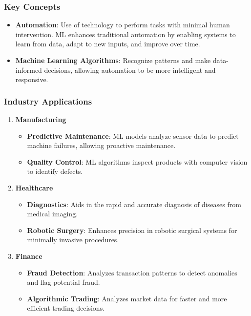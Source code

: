 \documentclass{beamer}
\begin{document}
\begin{frame}[fragile]
    \frametitle{Key Concepts}
    \begin{itemize}
        \item \textbf{Automation}: Use of technology to perform tasks with minimal human intervention. ML enhances traditional automation by enabling systems to learn from data, adapt to new inputs, and improve over time.
        \item \textbf{Machine Learning Algorithms}: Recognize patterns and make data-informed decisions, allowing automation to be more intelligent and responsive.
    \end{itemize}
\end{frame}

\begin{frame}[fragile]
    \frametitle{Industry Applications}
    \begin{enumerate}
        \item \textbf{Manufacturing}
        \begin{itemize}
            \item \textbf{Predictive Maintenance}: ML models analyze sensor data to predict machine failures, allowing proactive maintenance.
            \item \textbf{Quality Control}: ML algorithms inspect products with computer vision to identify defects.
        \end{itemize}

        \item \textbf{Healthcare}
        \begin{itemize}
            \item \textbf{Diagnostics}: Aids in the rapid and accurate diagnosis of diseases from medical imaging.
            \item \textbf{Robotic Surgery}: Enhances precision in robotic surgical systems for minimally invasive procedures.
        \end{itemize}
        
        \item \textbf{Finance}
        \begin{itemize}
            \item \textbf{Fraud Detection}: Analyzes transaction patterns to detect anomalies and flag potential fraud.
            \item \textbf{Algorithmic Trading}: Analyzes market data for faster and more efficient trading decisions.
        \end{itemize}
    \end{enumerate}
\end{frame}
\end{document}
